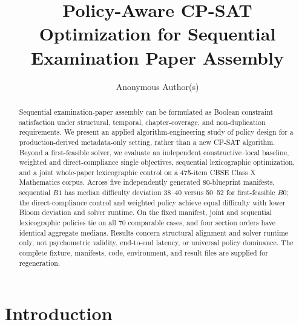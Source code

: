 \documentclass[runningheads]{llncs}
\begin{document}
\title{Policy-Aware CP-SAT Optimization for Sequential Examination Paper Assembly}

\author{Anonymous Author(s)}

\maketitle

\begin{abstract}
Sequential examination-paper assembly can be formulated as Boolean constraint satisfaction under structural, temporal, chapter-coverage, and non-duplication requirements. We present an applied algorithm-engineering study of policy design for a production-derived metadata-only setting, rather than a new CP-SAT algorithm. Beyond a first-feasible solver, we evaluate an independent constructive--local baseline, weighted and direct-compliance single objectives, sequential lexicographic optimization, and a joint whole-paper lexicographic control on a 475-item CBSE Class X Mathematics corpus. Across five independently generated 80-blueprint manifests, sequential $B1$ has median difficulty deviation 38--40 versus 50--52 for first-feasible $B0$; the direct-compliance control and weighted policy achieve equal difficulty with lower Bloom deviation and solver runtime. On the fixed manifest, joint and sequential lexicographic policies tie on all 70 comparable cases, and four section orders have identical aggregate medians. Results concern structural alignment and solver runtime only, not psychometric validity, end-to-end latency, or universal policy dominance. The complete fixture, manifests, code, environment, and result files are supplied for regeneration.
\end{abstract}

\section{Introduction}
\label{sec:intro}
\end{document}
